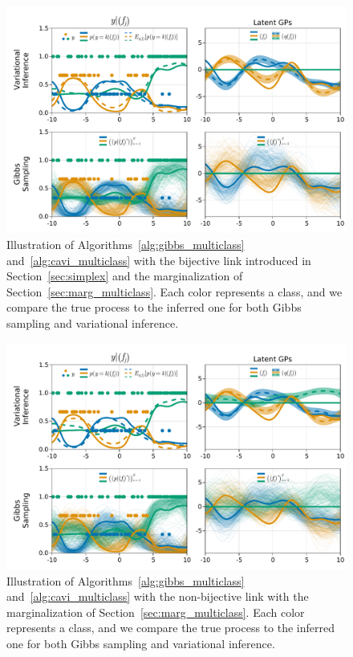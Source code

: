 \begin{figure}
    \includegraphics[width=\textwidth]{./chapters/8_discussions/figures/categorical_bijective.pdf}
    \caption{Illustration of Algorithms~\ref{alg:gibbs_multiclass} and~\ref{alg:cavi_multiclass} with the bijective link introduced in Section~\ref{sec:simplex} and the marginalization of Section~\ref{sec:marg_multiclass}.
    Each color represents a class, and we compare the true process to the inferred one for both Gibbs sampling and variational inference.}
    \label{fig:bijective_multiclass}
\end{figure}
\begin{figure}
    \includegraphics[width=\textwidth]{./chapters/8_discussions/figures/categorical_nonbijective.pdf}
    \caption{Illustration of Algorithms~\ref{alg:gibbs_multiclass} and~\ref{alg:cavi_multiclass} with the non-bijective link with the marginalization of Section~\ref{sec:marg_multiclass}.
    Each color represents a class, and we compare the true process to the inferred one for both Gibbs sampling and variational inference.}
    \label{fig:multiclass}
\end{figure}

